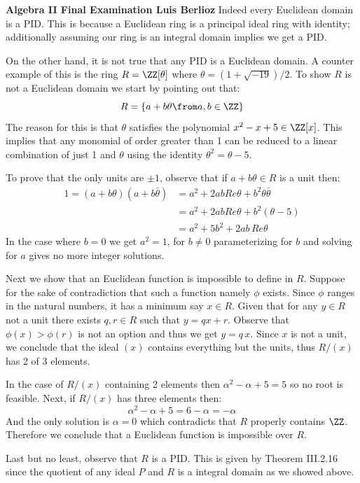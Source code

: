 \noindent\textbf{Algebra II Final Examination \hspace{\fill} Luis Berlioz}
Indeed every Euclidean domain is a PID. This is because a Euclidean ring is a  principal ideal ring with identity; additionally assuming our ring is an integral domain implies we get a PID.

On the other hand, it is not true that any PID is a Euclidean domain. A counter example of this is the ring $R=\ZZ[\theta]$ where $\theta=(1+\sqrt{-19})/2$. To show $R$ is not a Euclidean domain we start by pointing out that:
\[R=\{a+b\theta\from a,b\in\ZZ\}\]
The reason for this is that $\theta$ satisfies the polynomial $x^2-x+5\in \ZZ[x]$. This implies that any monomial of order greater than 1 can be reduced to a linear combination of just 1 and $\theta$ using the identity $\theta^2=\theta-5$.

To prove that the only units are $\pm 1$, observe that if $a+b\theta\in R$ is a unit then:
\begin{align*}
   1 =(a+b\theta)(a+b\bar\theta) &= a^2+2abRe\theta +b^2\theta\bar\theta\\
                           &= a^2+2abRe\theta +b^2(\theta-5)\\
                           &= a^2+5b^2+2ab\,Re\theta
\end{align*}
In the case where $b=0$ we get $a^2=1$, for $b\neq 0$ parameterizing for $b$ and solving for $a$ gives no more integer solutions.

Next we show that an Euclidean function is impossible to define in $R$. Suppose for the sake of contradiction that such a function namely $\phi$ exists. Since $\phi$ ranges in the natural numbers, it has a minimum say $x\in R$. Given that for any $y\in R$ not a unit there exists $q,r\in R$ such that $y=qx+r$.  Observe that $\phi(x)> \phi(r)$ is not an option and thus we get $y= q\, x$. Since $x$ is not a unit, we conclude that the ideal $(x)$ contains everything but the units, thus $R/(x)$ has 2 of 3 elements.

In the case of $R/(x)$ containing 2 elements then $\alpha^2-\alpha+5=5$ so no root is feasible. Next, if $R/(x)$ has three elements then:
$$\alpha^2-\alpha+5= 6-\alpha = -\alpha$$
And the only solution is $\alpha=0$ which contradicts that $R$ properly contains $\ZZ$. Therefore we conclude that a Euclidean function is impossible over $R$.

Last but no least, observe that $R$ is a PID. This is given by Theorem III.2.16 since the quotient of any ideal $P$ and $R$ is a integral domain as we showed above. 

